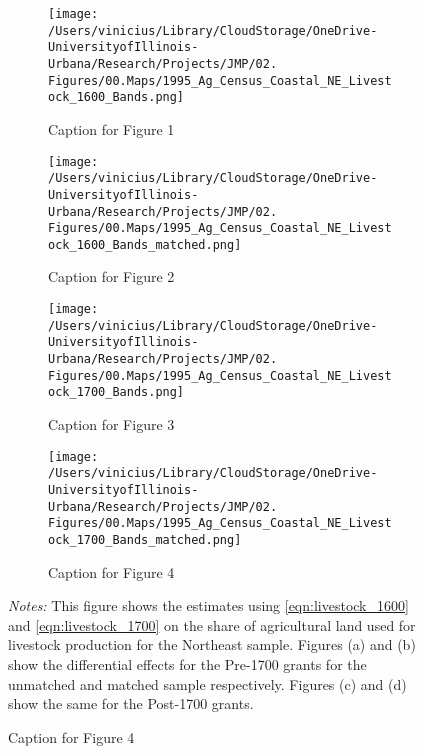\documentclass[11pt]{article}
\begin{document}
\clearpage

\begin{landscape}
  \begin{figure}[htbp]
    \caption{Effects of Coastal Ban on Livestock with Varying Cutoffs on Livestock Area - Northeast Sample}
    \centering
    \begin{subfigure}[b]{0.65\textwidth}
        \centering
        \texttt{[image: /Users/vinicius/Library/CloudStorage/OneDrive-UniversityofIllinois-Urbana/Research/Projects/JMP/02. Figures/00.Maps/1995\_Ag\_Census\_Coastal\_NE\_Livestock\_1600\_Bands.png]}
        \caption{Caption for Figure 1}
        \label{fig:fig1}
    \end{subfigure}
    \hfill
    \begin{subfigure}[b]{0.65\textwidth}
        \centering
        \texttt{[image: /Users/vinicius/Library/CloudStorage/OneDrive-UniversityofIllinois-Urbana/Research/Projects/JMP/02. Figures/00.Maps/1995\_Ag\_Census\_Coastal\_NE\_Livestock\_1600\_Bands\_matched.png]}
        \caption{Caption for Figure 2}
        \label{fig:fig2}
    \end{subfigure}

    \vspace{0.1cm} %

    \begin{subfigure}[b]{0.65\textwidth}
        \centering
        \texttt{[image: /Users/vinicius/Library/CloudStorage/OneDrive-UniversityofIllinois-Urbana/Research/Projects/JMP/02. Figures/00.Maps/1995\_Ag\_Census\_Coastal\_NE\_Livestock\_1700\_Bands.png]}
        \caption{Caption for Figure 3}
        \label{fig:fig3}
    \end{subfigure}
    \hfill
    \begin{subfigure}[b]{0.65\textwidth}
        \centering
        \texttt{[image: /Users/vinicius/Library/CloudStorage/OneDrive-UniversityofIllinois-Urbana/Research/Projects/JMP/02. Figures/00.Maps/1995\_Ag\_Census\_Coastal\_NE\_Livestock\_1700\_Bands\_matched.png]}
        \caption{Caption for Figure 4}
        \label{fig:fig4}
    \end{subfigure}

    \vspace{0.5cm}
    \justifying
    \noindent \textit{Notes:} This figure shows the estimates using \autoref{eqn:livestock_1600} and \autoref{eqn:livestock_1700} on the share of agricultural land used for livestock production for the Northeast sample. Figures (a) and (b) show the differential effects for the Pre-1700 grants for the unmatched and matched sample respectively. Figures (c) and (d) show the same for the Post-1700 grants.
    \label{fig:robustness_NE_distance_cutoff}
    
\end{figure}
\end{landscape}
\end{document}
